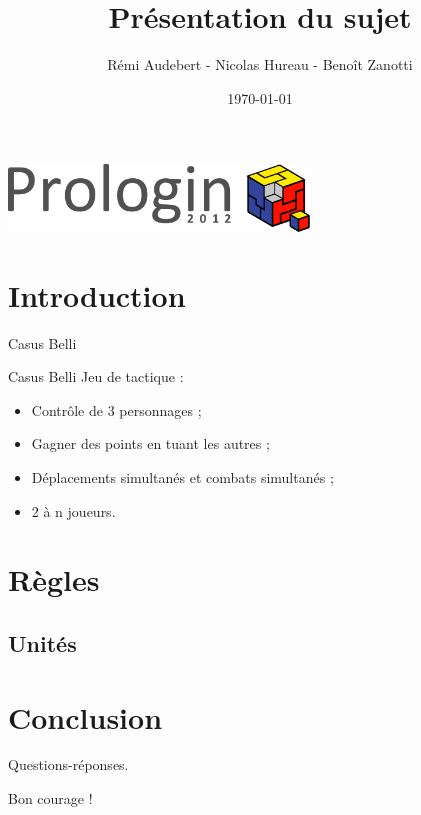 \documentclass[pdftex]{beamer}
\title{Présentation du sujet}
\author{Rémi Audebert - Nicolas Hureau - Benoît Zanotti}
\date{\today}
\begin{document}
\begin{frame}
    \center \includegraphics[width=0.6\textwidth]{prologin2012}
    \titlepage
\end{frame}

\section{Introduction}

\begin{frame}{Casus Belli}
\end{frame}

\begin{frame}{Casus Belli}
    Jeu de tactique :
    \begin{itemize}
        \item Contrôle de 3 personnages ;
        \item Gagner des points en tuant les autres ;
        \item Déplacements simultanés et combats simultanés ;
        \item 2 à n joueurs.
    \end{itemize}
\end{frame}

\section{Règles}

\subsection{Unités}

\section{Conclusion}

\begin{frame}
    \begin{center}
        Questions-réponses.
    \end{center}
\end{frame}

\begin{frame}
    \begin{center}
        Bon courage !
    \end{center}
\end{frame}
\end{document}
